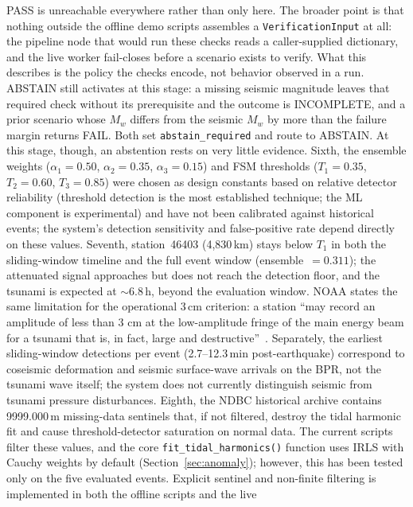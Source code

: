\documentclass{article}
\begin{document}
PASS is unreachable everywhere rather than only here.  The broader
point is that nothing outside the offline demo scripts assembles a
\texttt{VerificationInput} at all: the pipeline node that would run these checks reads a
caller-supplied dictionary, and the live worker fail-closes before a
scenario exists to verify.  What this describes is the policy the
checks encode, not behavior observed in a run.
ABSTAIN still activates at this stage: a missing seismic
magnitude leaves that required check without its prerequisite and the
outcome is INCOMPLETE, and a prior scenario whose $M_w$ differs from
the seismic $M_w$ by more than the failure margin returns FAIL.  Both
set \texttt{abstain\_required} and route to ABSTAIN.  At this stage, though, an abstention rests on very little evidence.
Sixth, the ensemble weights ($\alpha_1{=}0.50$, $\alpha_2{=}0.35$,
$\alpha_3{=}0.15$) and FSM thresholds ($T_1{=}0.35$, $T_2{=}0.60$,
$T_3{=}0.85$) were chosen as design constants based on relative
detector reliability (threshold detection is the most established
technique; the ML component is experimental) and have not been
calibrated against historical events; the system's detection
sensitivity and false-positive rate depend directly on these values.
Seventh, station~46403 (4{,}830\,km) stays below $T_1$ in both the
sliding-window timeline and the full event window
(ensemble~$= 0.311$); the attenuated signal approaches but does not
reach the detection floor, and the tsunami is expected at
${\sim}6.8$\,h, beyond the evaluation window.  NOAA states the same
limitation for the operational 3\,cm criterion: a station ``may record
an amplitude of less than 3 cm at the low-amplitude fringe of the main
energy beam for a tsunami that is, in fact, large and
destructive''~\citep[pp.~31--32]{gonzalez2005nthmp}.  Separately, the earliest sliding-window detections per event
(2.7--12.3\,min post-earthquake) correspond to coseismic deformation and seismic
surface-wave arrivals on the BPR, not
the tsunami wave itself; the system does not currently distinguish
seismic from tsunami pressure disturbances.
Eighth, the NDBC historical archive contains 9999.000\,m missing-data
sentinels that, if not filtered, destroy the tidal harmonic fit and cause
threshold-detector saturation on normal data.  The current scripts
filter these values, and the core \texttt{fit\_tidal\_harmonics()}
function uses IRLS with Cauchy weights by default
(Section~\ref{sec:anomaly}); however, this has been tested
only on the five evaluated events.  Explicit sentinel and non-finite
filtering is implemented in both the offline scripts and the live
\end{document}
